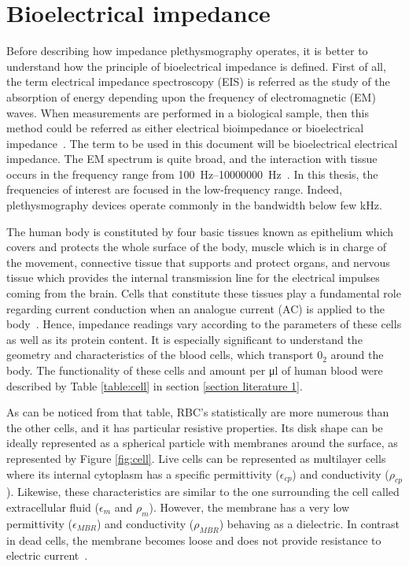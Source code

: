 \section{Bioelectrical impedance}
\label{section impedance 2}
Before describing how impedance plethysmography operates, it is better to understand how the principle of bioelectrical impedance is defined. First of all, the term electrical impedance spectroscopy (EIS) is referred as the study of the absorption of energy depending upon the frequency of electromagnetic (EM) waves. When measurements are performed in a biological sample, then this method could be referred as either electrical bioimpedance or bioelectrical impedance~\cite{ivorra2003bioimpedance}. The term to be used in this document will be bioelectrical electrical impedance. The EM spectrum is quite broad, and the interaction with tissue occurs in the frequency range from \SIrange[scientific-notation = engineering]{100}{10000000}{\hertz}~\cite{bertemes2002tissue}. In this thesis, the frequencies of interest are focused in the low-frequency range. Indeed, plethysmography devices operate commonly in the bandwidth below few \si{\kilo\hertz}.

The human body is constituted by four basic tissues known as epithelium which covers and protects the whole surface of the body, muscle which is in charge of the movement, connective tissue that supports and protect organs, and nervous tissue which provides the internal transmission line for the electrical impulses coming from the brain. Cells that constitute these tissues play a fundamental role regarding current conduction when an analogue current (AC) is applied to the body~\cite{lvovich2012impedance}. Hence, impedance readings vary according to the parameters of these cells as well as its protein content. It is especially significant to understand the geometry and characteristics of the blood cells, which transport $0_2$ around the body. The functionality of these cells and amount per \si{\micro\litre} of human blood were described by Table \ref{table:cell} in section \ref{section literature 1}.

As can be noticed from that table, RBC's statistically are more numerous than the other cells, and it has particular resistive properties. Its disk shape can be ideally represented as a spherical particle with membranes around the surface, as represented by Figure \ref{fig:cell}. Live cells can be represented as multilayer cells where its internal cytoplasm has a specific permittivity ($\epsilon_{cp}$) and conductivity ($\rho_{cp}$). Likewise, these characteristics are similar to the one surrounding the cell called extracellular fluid ($\epsilon_m$ and $\rho_m$). However, the membrane has a very low permittivity ($\epsilon_{MBR}$) and conductivity ($\rho_{MBR}$) behaving as a dielectric. In contrast in dead cells, the membrane becomes loose and does not provide resistance to electric current~\cite{lvovich2012impedance}.


